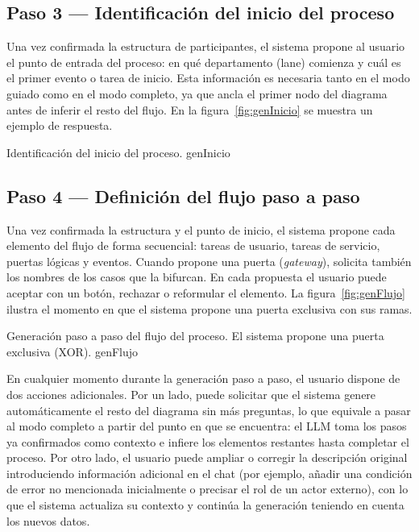 \subsection{Paso 3 --- Identificación del inicio del proceso}
\label{subsec:demoInicio}

Una vez confirmada la estructura de participantes, el sistema propone al usuario el punto de entrada del proceso: en qué departamento (lane) comienza y cuál es el primer evento o tarea de inicio. Esta información es necesaria tanto en el modo guiado como en el modo completo, ya que ancla el primer nodo del diagrama antes de inferir el resto del flujo. En la figura~\ref{fig:genInicio} se muestra un ejemplo de respuesta.

%
  {Identificación del inicio del proceso.}%
  {genInicio}

\subsection{Paso 4 --- Definición del flujo paso a paso}
\label{subsec:demoFlujo}

Una vez confirmada la estructura y el punto de inicio, el sistema propone cada elemento del flujo de forma secuencial: tareas de usuario, tareas de servicio, puertas lógicas y eventos. Cuando propone una puerta (\textit{gateway}), solicita también los nombres de los casos que la bifurcan. En cada propuesta el usuario puede aceptar con un botón, rechazar o reformular el elemento. La figura~\ref{fig:genFlujo} ilustra el momento en que el sistema propone una puerta exclusiva con sus ramas.

%
  {Generación paso a paso del flujo del proceso. El sistema propone una puerta exclusiva (XOR).}%
  {genFlujo}

En cualquier momento durante la generación paso a paso, el usuario dispone de dos acciones adicionales. Por un lado, puede solicitar que el sistema genere automáticamente el resto del diagrama sin más preguntas, lo que equivale a pasar al modo completo a partir del punto en que se encuentra: el LLM toma los pasos ya confirmados como contexto e infiere los elementos restantes hasta completar el proceso. Por otro lado, el usuario puede ampliar o corregir la descripción original introduciendo información adicional en el chat (por ejemplo, añadir una condición de error no mencionada inicialmente o precisar el rol de un actor externo), con lo que el sistema actualiza su contexto y continúa la generación teniendo en cuenta los nuevos datos.

